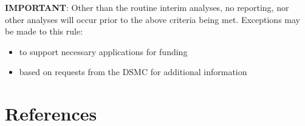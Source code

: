 \documentclass[
]{article}
\begin{document}
\textbf{IMPORTANT}: Other than the routine interim analyses, no reporting, nor other analyses will occur prior to the above criteria being met.
Exceptions may be made to this rule:

\begin{itemize}
\item to support necessary applications for funding
\item based on requests from the DSMC for additional information
\end{itemize}

\clearpage

\hypertarget{references}{%
\section*{References}\label{references}}



\end{document}
